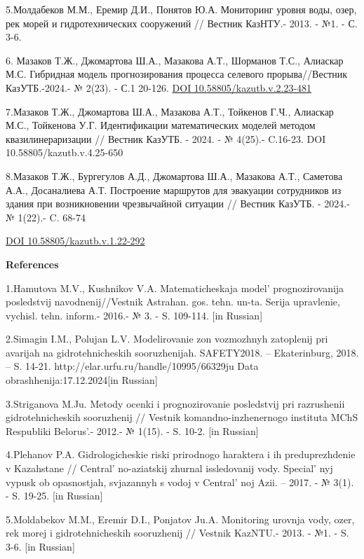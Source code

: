 {5.Молдабеков М.М., Еремир Д.И., Понятов Ю.А. Мониторинг уровня воды,
озер, рек морей и гидротехнических сооружений // Вестник КазНТУ.- 2013.
- №1. - С. 3-6.

6. Мазаков Т.Ж., Джомартова Ш.А., Мазакова А.Т., Шорманов Т.С., Алиаскар
М.С. Гибридная модель прогнозирования процесса селевого прорыва//Вестник
КазУТБ.-2024.- № 2(23). - С.1 20-126.
\href{https://doi.org/10.58805/kazutb.v.2.23-481}{DOI
10.58805/kazutb.v.2.23-481}

7.Мазаков Т.Ж., Джомартова Ш.А., Мазакова А.Т., Тойкенов Г.Ч., Алиаскар
М.С., Тойкенова У.Г. Идентификации математических моделей методом
квазилинераризации // Вестник КазУТБ. - 2024. - № 4(25).- C.16-23. DOI
10.58805/kazutb.v.4.25-650

8.Мазаков Т.Ж., Бургегулов А.Д., Джомартова Ш.А., Мазакова А.Т.,
Саметова А.А., Досаналиева А.Т. Построение маршрутов для эвакуации
сотрудников из здания при возникновении чрезвычайной ситуации // Вестник
КазУТБ. - 2024.- № 1(22).- C. 68-74

\href{https://doi.org/10.58805/kazutb.v.1.22-292}{DOI
10.58805/kazutb.v.1.22-292}

{\bfseries References}

1.Hamutova M.V., Kushnikov V.A. Matematicheskaja model'{}
prognozirovanija posledstvij navodnenij//Vestnik Astrahan. gos. tehn.
un-ta. Serija upravlenie, vychisl. tehn. inform.- 2016.- № 3. - S.
109-114. {[}in Russian{]}

2.Simagin I.M., Polujan L.V. Modelirovanie zon vozmozhnyh zatoplenij pri
avarijah na gidrotehnicheskih sooruzhenijah. SAFETY2018. --
Ekaterinburg, 2018. -- S. 14-21.
http://elar.urfu.ru/handle/10995/66329ju Data
obrashhenija:17.12.2024{[}in Russian{]}

3.Striganova M.Ju. Metody ocenki i prognozirovanie posledstvij pri
razrushenii gidrotehnicheskih sooruzhenij // Vestnik
komandno-inzhenernogo instituta MChS Respubliki
Belorus'.- 2012.- № 1(15). - S. 10-2. {[}in Russian{]}

4.Plehanov P.A. Gidrologicheskie riski prirodnogo haraktera i ih
preduprezhdenie v Kazahstane // Central' no-aziatskij
zhurnal issledovanij vody. Special' nyj vypusk ob
opasnostjah, svjazannyh s vodoj v Central' noj Azii. --
2017. - № 3(1). - S. 19-25. {[}in Russian{]}

5.Moldabekov M.M., Eremir D.I., Ponjatov Ju.A. Monitoring urovnja vody,
ozer, rek morej i gidrotehnicheskih sooruzhenij // Vestnik KazNTU.-
2013. - №1. - S. 3-6. {[}in Russian{]}

}
